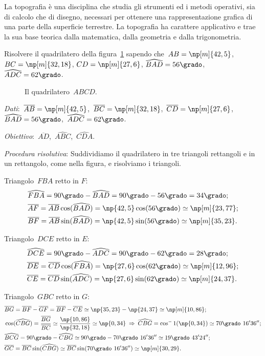 La topografia è una disciplina che studia gli strumenti ed i metodi operativi, sia di calcolo che di disegno, necessari per ottenere
una rappresentazione grafica di una parte della superficie terrestre.
La topografia ha carattere applicativo e trae la sua base teorica dalla matematica, dalla geometria e dalla trigonometria.

\begin{exrig}
 \begin{esempio}
Risolvere il quadrilatero della figura~\ref{fig:G.7} sapendo che~$AB=\np[m]{42,5}$, $BC=\np[m]{32,18}$, $CD=\np[m]{27,6}$,
$\widehat{BAD}=56\grado$, $\widehat{ADC}=62\grado$.

\begin{figure}[ht]
\centering

\caption{Il quadrilatero~$ABCD$.}\label{fig:G.7}
\end{figure}

\emph{Dati}:~$\overline{AB}=\np[m]{42,5}$,\quad~$\overline{BC}=\np[m]{32,18}$,\quad~$\overline{CD}=\np[m]{27,6}$,\quad~$\widehat{BAD}=56\grado$,\quad~$\widehat{ADC}=62\grado$.

\emph{Obiettivo}:~$\overline{AD}$,\quad~$\widehat{ABC}$,\quad~$\widehat{CDA}$.

\emph{Procedura risolutiva}:
Suddividiamo il quadrilatero in tre triangoli rettangoli e in un rettangolo, come nella figura, e risolviamo i triangoli.

Triangolo~$FBA$ retto in $F$:
\begin{align*}
&\widehat{FBA}=90\grado-\widehat{BAD}=90\grado-56\grado=34\grado;\\
&\overline{AF}=\overline{AB}\cos(\widehat{BAD})=\np{42,5}\cos(56\grado)\simeq \np[m]{23,77};\\
&\overline{BF}=\overline{AB}\sin(\widehat{BAD})=\np{42,5}\sin(56\grado)\simeq \np[m]{35,23}.
\end{align*}

Triangolo~$DCE$ retto in $E$:
\begin{align*}
&\widehat{DCE}=90\grado-\widehat{ADC}=90\grado-62\grado=28\grado;\\
&\overline{DE}=\overline{CD}\cos(\widehat{FBA})=\np{27,6}\cos(62\grado)\simeq \np[m]{12,96};\\
&\overline{CE}=\overline{CD}\sin(\widehat{ADC})=\np{27,6}\sin(62\grado)\simeq \np[m]{24,37}.
\end{align*}

Triangolo~$GBC$ retto in $G$:
\begin{align*}
&\overline{BG}=\overline{BF}-\overline{GF}=\overline{BF}-\overline{CE}\simeq \np{35,23}-\np{24,37}\simeq \np[m]{10,86};\\
&\cos(\widehat{CBG})=\frac{\overline{BG}}{\overline{BC}}\simeq \frac{\np{10,86}}{\np{32,18}}\simeq \np{0,34}\:\Rightarrow\: \widehat{CBG}=\cos^-1(\np{0,34})\simeq 70\grado~16' 36'';\\
&\widehat{BCG}=90\grado-\widehat{CBG}\simeq 90\grado-70\grado~16' 36''\simeq 19\grado~43' 24'';\\
&\overline{GC}=\overline{BC}\sin(\widehat{CBG})\simeq \overline{BC}\sin(70\grado~16' 36'')\simeq \np[m]{30,29}.
\end{align*}


\end{esempio}
\end{exrig}
